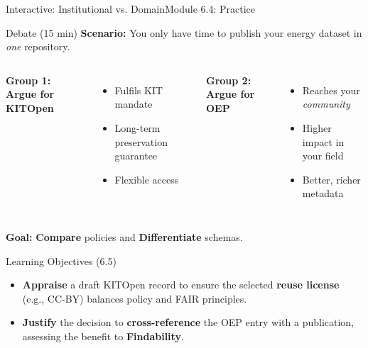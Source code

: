 \begin{frame}{Interactive: Institutional vs. Domain}{Module 6.4: Practice}
    \begin{block}{Debate (15 min)}
        \textbf{Scenario:} You only have time to publish your energy dataset in \emph{one} repository.
        \pause
        \begin{columns}
            \textbf{Group 1: Argue for KITOpen}
            \begin{itemize}
                \item Fulfils KIT mandate
                \item Long-term preservation guarantee
                \item Flexible access
            \end{itemize}
            
            \textbf{Group 2: Argue for OEP}
            \begin{itemize}
                \item Reaches your \textit{community}
                \item Higher impact in your field
                \item Better, richer metadata
            \end{itemize}
        \end{columns}
        \pause
        \textbf{Goal:} \textbf{Compare} policies and \textbf{Differentiate} schemas.
    \end{block}
\end{frame}

\begin{frame}{Learning Objectives (6.5)}
    \begin{itemize}
        \item \textbf{Appraise} a draft KITOpen record to ensure the selected \textbf{reuse license} (e.g., CC-BY) balances policy and FAIR principles.
        \item \textbf{Justify} the decision to \textbf{cross-reference} the OEP entry with a publication, assessing the benefit to \textbf{Findability}.
    \end{itemize}
\end{frame}


